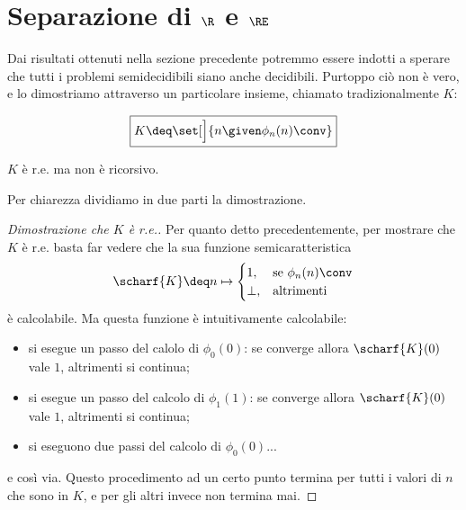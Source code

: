 \section{Separazione di $\R$ e $\RE$}

Dai risultati ottenuti nella sezione precedente potremmo essere indotti a sperare che tutti i problemi semidecidibili siano anche decidibili. Purtoppo ciò non è vero, e lo dimostriamo attraverso un particolare insieme, chiamato tradizionalmente $K$:

\begin{equation}
    \boxed{K \deq \set[\Big]{n \given \phi_n(n)\conv}}
\end{equation}

\begin{theorem}
    {}{}
    $K$ è r.e. ma non è ricorsivo.
\end{theorem}

Per chiarezza dividiamo in due parti la dimostrazione.

\begin{proof}[Dimostrazione che $K$ è r.e.]
    Per quanto detto precedentemente, per mostrare che $K$ è r.e. basta far vedere che la sua funzione semicaratteristica \[
        \scharf{K} \deq n \mapsto \begin{cases}
            1, &\text{se } \phi_n(n)\conv \\
            \bot, &\text{altrimenti}
        \end{cases}
    \] è calcolabile. Ma questa funzione è intuitivamente calcolabile: \begin{itemize}
        \item si esegue un passo del calolo di $\phi_0(0)$: se converge allora $\scharf{K}(0)$ vale $1$, altrimenti si continua;
        \item si esegue un passo del calcolo di $\phi_1(1)$: se converge allora $\scharf{K}(0)$ vale $1$, altrimenti si continua;
        \item si eseguono due passi del calcolo di $\phi_0(0)$...       
    \end{itemize} e così via. Questo procedimento ad un certo punto termina per tutti i valori di $n$ che sono in $K$, e per gli altri invece non termina mai.
\end{proof}

